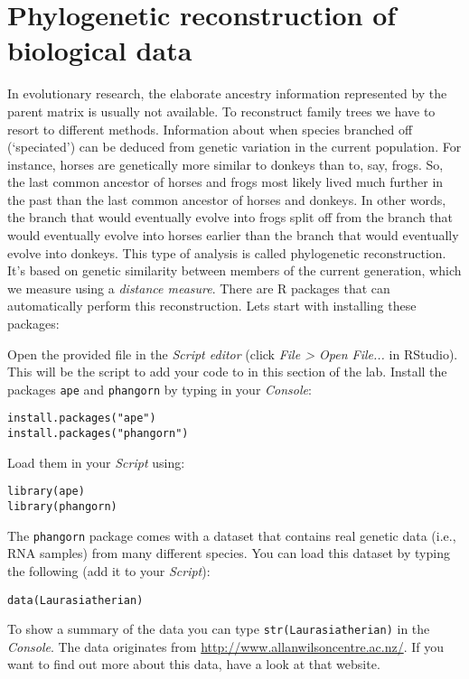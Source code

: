 \documentclass[a4paper, 9pt]{article}
\begin{document}
\section{Phylogenetic reconstruction of biological data}\label{phylogenetic-reconstruction-with-r}

In evolutionary research, the elaborate ancestry information represented
by the parent matrix is usually not available. To reconstruct family
trees we have to resort to different methods. Information about when
species branched off (`speciated') can be deduced from genetic variation
in the current population. For instance, horses are genetically more
similar to donkeys than to, say, frogs. So, the last common ancestor of
horses and frogs most likely lived much further in the past than the
last common ancestor of horses and donkeys. In other words, the branch
that would eventually evolve into frogs split off from the branch that
would eventually evolve into horses earlier than the branch that would
eventually evolve into donkeys. This type of analysis is called
phylogenetic reconstruction. It's based on genetic similarity between
members of the current generation, which we measure using a
\emph{distance measure}. There are R packages that can automatically
perform this reconstruction. Lets start with installing these packages:

\begin{exercise}
\action Open the provided  file in the \emph{Script editor} (click \emph{File > Open File...} in RStudio). This will be the script to add your code to in this section of the lab. 
    \action Install the packages \texttt{ape} and \texttt{phangorn} by typing in your \emph{Console}:\begin{lstlisting}
install.packages("ape")
install.packages("phangorn")      
\end{lstlisting}
Load them in your \emph{Script} using:\begin{lstlisting}
library(ape)
library(phangorn)
\end{lstlisting}
\end{exercise}

The \texttt{phangorn} package comes with a dataset that contains real
genetic data (i.e., RNA samples) from many different species. You can
load this dataset by typing the following (add it to your \emph{Script}):
\begin{lstlisting}
data(Laurasiatherian)
\end{lstlisting}
To show a summary of the data you can type
\texttt{str(Laurasiatherian)} in the \emph{Console}. The data originates from
\url{http://www.allanwilsoncentre.ac.nz/}. If you want to find out more
about this data, have a look at that website.
\end{document}
